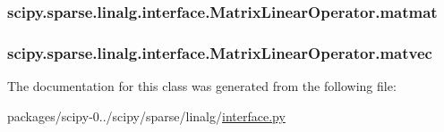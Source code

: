 \subsubsection[{matmat}]{\setlength{\rightskip}{0pt plus 5cm}scipy.\+sparse.\+linalg.\+interface.\+Matrix\+Linear\+Operator.\+matmat}\label{classscipy_1_1sparse_1_1linalg_1_1interface_1_1MatrixLinearOperator_a85a09d2f506ba780bfdd92725447c317}
\hypertarget{classscipy_1_1sparse_1_1linalg_1_1interface_1_1MatrixLinearOperator_a93edeb0c84ee1fde10f76531c8e2839c}{}
\subsubsection[{matvec}]{\setlength{\rightskip}{0pt plus 5cm}scipy.\+sparse.\+linalg.\+interface.\+Matrix\+Linear\+Operator.\+matvec}\label{classscipy_1_1sparse_1_1linalg_1_1interface_1_1MatrixLinearOperator_a93edeb0c84ee1fde10f76531c8e2839c}


The documentation for this class was generated from the following file\+:\begin{DoxyCompactItemize}
\item 
packages/scipy-\/0../scipy/sparse/linalg/\hyperlink{interface_8py}{interface.\+py}\end{DoxyCompactItemize}
